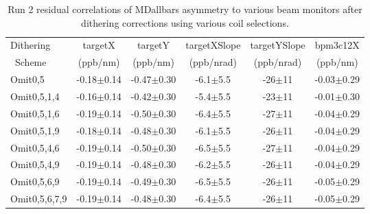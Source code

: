 \begin{table}[!h]
\caption{Run 2 residual correlations of MDallbars asymmetry to various beam monitors after dithering corrections using various coil selections.}
\begin{center}
\begin{tabular}[h]{|l|c|c|c|c|c|}\hline
Dithering&targetX&targetY&targetXSlope&targetYSlope&bpm3c12X\\
~Scheme&(ppb/nm)&(ppb/nm)&(ppb/nrad)&(ppb/nrad)&(ppb/nm)\\\hline
Omit0,5& -0.18$\pm$0.14& -0.47$\pm$0.30& -6.1$\pm$5.5& -26$\pm$11& -0.03$\pm$0.29\\\hline
Omit0,5,1,4& -0.16$\pm$0.14& -0.42$\pm$0.30& -5.4$\pm$5.5& -23$\pm$11& -0.01$\pm$0.30\\\hline
Omit0,5,1,6& -0.19$\pm$0.14& -0.50$\pm$0.30& -6.4$\pm$5.5& -27$\pm$11& -0.04$\pm$0.29\\\hline
Omit0,5,1,9& -0.18$\pm$0.14& -0.48$\pm$0.30& -6.1$\pm$5.5& -26$\pm$11& -0.04$\pm$0.29\\\hline
Omit0,5,4,6& -0.19$\pm$0.14& -0.50$\pm$0.30& -6.5$\pm$5.5& -27$\pm$11& -0.04$\pm$0.29\\\hline
Omit0,5,4,9& -0.19$\pm$0.14& -0.48$\pm$0.30& -6.2$\pm$5.5& -26$\pm$11& -0.04$\pm$0.29\\\hline
Omit0,5,6,9& -0.19$\pm$0.14& -0.49$\pm$0.30& -6.5$\pm$5.5& -26$\pm$11& -0.05$\pm$0.29\\\hline
Omit0,5,6,7,9& -0.19$\pm$0.14& -0.48$\pm$0.30& -6.4$\pm$5.5& -26$\pm$11& -0.05$\pm$0.29\\\hline
\end{tabular}
\end{center}
\label{tab:run2_om05_residual_correlations_table}
\end{table}

